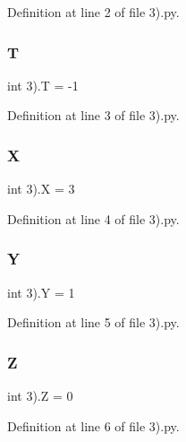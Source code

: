 Definition at line 2 of file 3).\+py.

\mbox{\label{namespace3_08_a5b66967c5e9d6761194169bd4d9b037f}} 
\subsubsection{T}
{\footnotesize\ttfamily int 3).T = -\/1}



Definition at line 3 of file 3).\+py.

\mbox{\label{namespace3_08_ac266e919de231d83205c04e7375110ef}} 
\subsubsection{X}
{\footnotesize\ttfamily int 3).X = 3}



Definition at line 4 of file 3).\+py.

\mbox{\label{namespace3_08_a0149bdb1ef3754f49f4096c9d2df286f}} 
\subsubsection{Y}
{\footnotesize\ttfamily int 3).Y = 1}



Definition at line 5 of file 3).\+py.

\mbox{\label{namespace3_08_a186f6addd9fba0c21effd27f1de822cb}} 
\subsubsection{Z}
{\footnotesize\ttfamily int 3).Z = 0}



Definition at line 6 of file 3).\+py.

